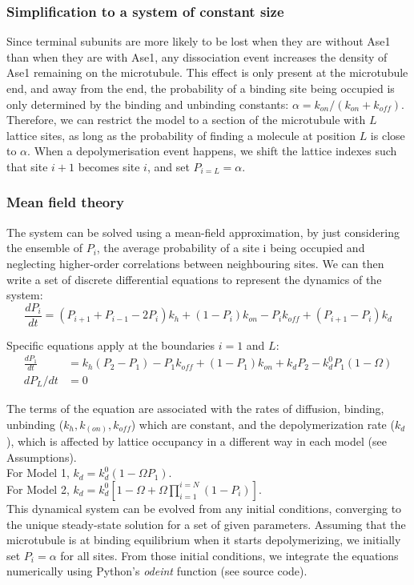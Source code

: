 \subsubsection{Simplification to a system of constant size}
Since terminal subunits are more likely to be lost when they are without Ase1 than when they are with Ase1, any dissociation event increases the density of Ase1 remaining on the microtubule. This effect is only present at the microtubule end, and away from the end, the probability of a binding site being occupied is only determined by the binding and unbinding constants: $\alpha=k_{on}/(k_{on}+k_{off})$.
Therefore, we can restrict the model to a section of the microtubule with $L$ lattice sites, as long as the probability of finding a molecule at position $L$ is close to $\alpha$. When a depolymerisation event happens, we shift the lattice indexes such that site $i+1$ becomes site $i$, and set $P_{i=L}= \alpha$. 

\subsubsection{Mean field theory}
The system can be solved using a mean-field approximation, by just considering the ensemble of  $P_i$, the average probability of a site i being occupied and neglecting higher-order correlations between neighbouring sites. We can then write a set of discrete differential equations to represent the dynamics of the system:
\begin{equation}
	\frac{dP_i}{dt}=(P_{i+1}+P_{i-1}-2P_i ) k_h+(1-P_i ) k_{on}-P_i k_{off}+(P_{i+1}-P_i ) k_d
\end{equation}

Specific equations apply at the boundaries $i=1$ and $L$:
\begin{align}
	\frac{dP_1}{dt} &= k_h (P_2-P_1 )-P_1 k_{off}+(1-P_1 ) k_{on}+k_d P_2-k_d^0 P_1 (1-\Omega) \\
	dP_L/dt &= 0
\end{align}

The terms of the equation are associated with the rates of diffusion, binding, unbinding ($k_h,k_(on ),k_{off}$) which are constant, and the depolymerization rate ($k_d$), which is affected by lattice occupancy in a different way in each model (see Assumptions).\\
For Model 1, $k_d=k_d^0 (1-\Omega P_1)$.\\
For Model 2, $k_d=k_d^0 [1-\Omega+\Omega\prod_{i=1}^{i=N}(1-P_i)]$.\\
This dynamical system can be evolved from any initial conditions, converging to the unique steady-state solution for a set of given parameters. Assuming that the microtubule is at binding equilibrium when it starts depolymerizing, we initially set $P_i=\alpha$ for all sites. From those initial conditions, we integrate the equations numerically using Python’s \textit{odeint} function (see source code).

